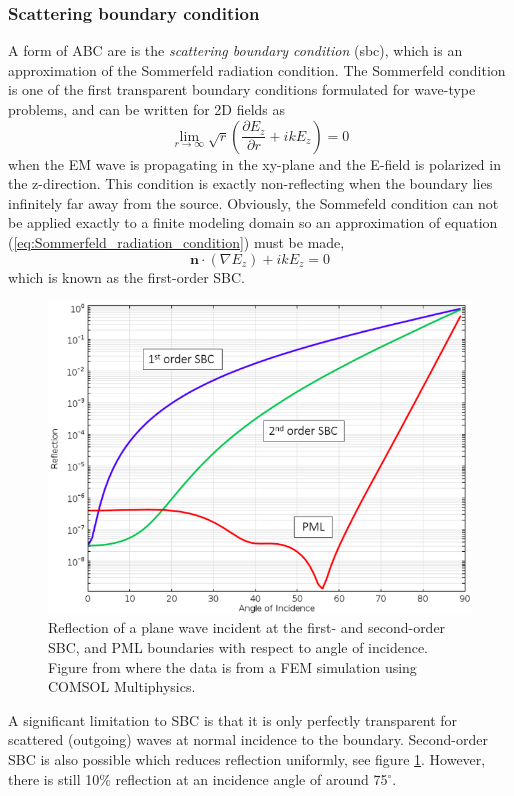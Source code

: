 \subsubsection*{Scattering boundary condition}
A form of ABC are is the \emph{scattering boundary condition} (\ac{sbc}), which is an approximation of the Sommerfeld radiation condition. The Sommerfeld condition is one of the first transparent boundary conditions formulated for wave-type problems, and can be written for 2D fields as
\begin{equation}
    \lim_{r \to \infty}\sqrt{r}\left(\frac{\partial E_z}{\partial r}+ikE_z\right) = 0
    \label{eq:Sommerfeld_radiation_condition}
\end{equation}
when the EM wave is propagating in the xy-plane and the E-field is polarized in the z-direction. This condition is exactly non-reflecting when the boundary lies infinitely far away from the source. Obviously, the Sommefeld condition can not be applied exactly to a finite modeling domain so an approximation of equation (\ref{eq:Sommerfeld_radiation_condition}) must be made, 
\begin{equation}
    \mathbf{n}\cdot(\nabla E_z) + ikE_z = 0
\end{equation}
which is known as the first-order SBC\cite{PML_SBC_comsol}.


\begin{figure}[ht!]
    \centering
    \includegraphics[width=0.7\linewidth]{figures/Ch2/PML_SBC_COMSOL.png}
    \caption{Reflection of a plane wave incident at the first- and second-order SBC, and PML boundaries with respect to angle of incidence. Figure from \cite{PML_SBC_comsol} where the data is from a FEM simulation using COMSOL Multiphysics.}
    \label{fig:PML_SBC}
\end{figure}

A significant limitation to SBC is that it is only perfectly transparent for scattered (outgoing) waves at normal incidence to the boundary\cite{comsol_referencemanual}. Second-order SBC is also possible which reduces reflection uniformly, see figure \ref{fig:PML_SBC}. However, there is still 10$\%$ reflection at an incidence angle of around 75$^\circ$.


